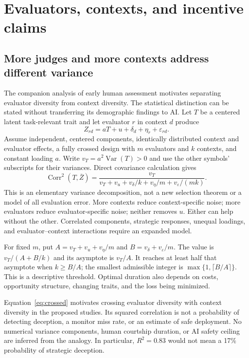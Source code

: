 \documentclass[10pt,twocolumn,letterpaper]{article}
\begin{document}
\section{Evaluators, contexts, and incentive claims}
\label{app:care}

\subsection{More judges and more contexts address different variance}
The companion analysis of early human assessment \cite{taylorhuman} motivates separating evaluator diversity from context diversity. The statistical distinction can be stated without transferring its demographic findings to AI. Let $T$ be a centered latent task-relevant trait and let evaluator $r$ in context $d$ produce
\[
 Z_{rd}=aT+u+\delta_d+\eta_r+\varepsilon_{rd}.
\]
Assume independent, centered components, identically distributed context and evaluator effects, a fully crossed design with $m$ evaluators and $k$ contexts, and constant loading $a$. Write $v_T=a^2\operatorname{Var}(T)>0$ and use the other symbols' subscripts for their variances. Direct covariance calculation gives
\begin{equation}
\operatorname{Corr}^2(T,\bar Z)=
\frac{v_T}{v_T+v_u+v_\delta/k+v_\eta/m+v_\varepsilon/(mk)}.
\label{eq:crossed}
\end{equation}
This is an elementary variance decomposition, not a new selection theorem or a model of all evaluation error. More contexts reduce context-specific noise; more evaluators reduce evaluator-specific noise; neither removes $u$. Either can help without the other. Correlated components, strategic responses, unequal loadings, and evaluator--context interactions require an expanded model.

For fixed $m$, put $A=v_T+v_u+v_\eta/m$ and $B=v_\delta+v_\varepsilon/m$. The value is $v_T/(A+B/k)$ and its asymptote is $v_T/A$. It reaches at least half that asymptote when $k\ge B/A$; the smallest admissible integer is $\max\{1,\lceil B/A\rceil\}$. This is a descriptive threshold. Optimal duration also depends on costs, opportunity structure, changing traits, and the loss being minimized.

Equation~\ref{eq:crossed} motivates crossing evaluator diversity with context diversity in the proposed studies. Its squared correlation is not a probability of detecting deception, a monitor miss rate, or an estimate of safe deployment. No numerical variance components, human courtship duration, or AI safety ceiling are inferred from the analogy. In particular, $R^2=0.83$ would not mean a 17\% probability of strategic deception.
\end{document}
